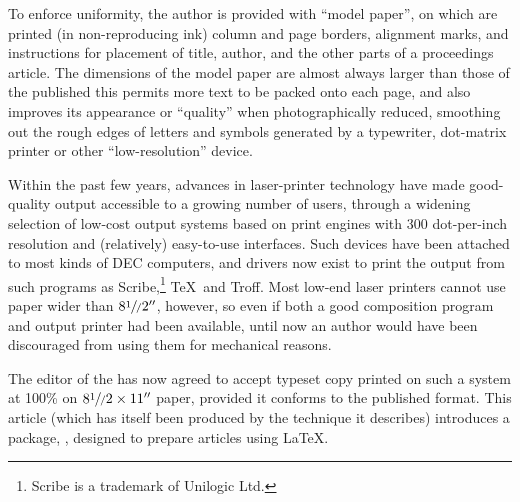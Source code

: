 To enforce uniformity, the author is provided with ``model paper'', on
which are printed (in non-reproducing ink) column and page borders,
alignment marks, and instructions for placement of title, author, and
the other parts of a proceedings article.  The dimensions of the model
paper are almost always larger than those of the published \Proc\Dash
this permits more text to be packed onto each page, and also improves
its appearance or ``quality'' when photographically reduced, smoothing
out the rough edges of letters and symbols generated by a typewriter,
dot-matrix printer or other ``low-resolution'' device.

Within the past few years, advances in laser-printer technology have
made good-quality output accessible to a growing number of users,
through a widening selection of low-cost output systems based on print
engines with 300 dot-per-inch resolution and (relatively) easy-to-use
interfaces.  Such devices have been attached to most kinds of DEC
computers, and drivers now exist to print the output from such programs
as Scribe,\footnote{Scribe is a trademark of Unilogic Ltd.}
\TeX\ and Troff.  Most low-end laser printers cannot use paper wider
than $8\sfrac1/2''$, however, so even if both a good composition
program and output printer had been available, until now an author
would have been discouraged from using them for mechanical reasons.

The editor of the \DProc\/ has now agreed to accept typeset copy
printed on such a system at 100\% on $8\sfrac1/2\times11''$ paper,
provided it conforms to the published format.  This article (which has
itself been produced by the technique it describes) introduces a
package, \DP, designed to prepare {\sl\Proc\/} articles using \LaTeX.











